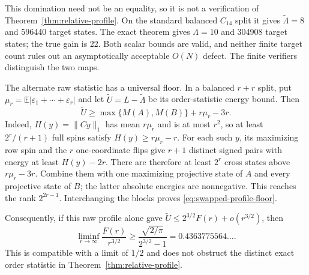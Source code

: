 \documentclass[11pt]{article}
\newcommand{\E}{\mathbb E}
\begin{document}
This domination need not be an equality, so it is not a verification of
Theorem~\ref{thm:relative-profile}.  On the standard balanced $C_{14}$ split
it gives $\widetilde\Lambda=8$ and 596440 target states.  The exact theorem
gives $\Lambda=10$ and 304908 target states; the true gain is 22.  Both scalar
bounds are valid, and neither finite target count rules out an asymptotically
acceptable $O(N)$ defect.  The finite verifiers distinguish the two maps.

The alternate raw statistic has a universal floor.  In a balanced $r+r$
split, put
$\mu_r=\E|\varepsilon_1+\cdots+\varepsilon_r|$ and let
$\widetilde U=L-\widetilde\Lambda$ be its order-statistic energy bound.  Then
\begin{equation}
 \widetilde U\ge
 \max\{M(A),M(B)\}+r\mu_r-3r.
 \label{eq:swapped-profile-floor}
\end{equation}
Indeed, $H(y)=\|Cy\|_1$ has mean $r\mu_r$ and is at most $r^2$, so at least
$2^r/(r+1)$ full spins satisfy $H(y)\ge r\mu_r-r$.  For each such $y$, its
maximizing row spin and the $r$ one-coordinate flips give $r+1$ distinct
signed pairs with energy at least $H(y)-2r$.  There are therefore at least
$2^r$ cross states above $r\mu_r-3r$.  Combine them with one maximizing
projective state of $A$ and every projective state of $B$; the latter absolute
energies are nonnegative.  This reaches the rank $2^{2r-1}$.  Interchanging
the blocks proves \eqref{eq:swapped-profile-floor}.

Consequently, if this raw profile alone gave
$\widetilde U\le2^{3/2}F(r)+o(r^{3/2})$, then
\begin{equation}
 \liminf_{r\to\infty}\frac{F(r)}{r^{3/2}}
 \ge\frac{\sqrt{2/\pi}}{2^{3/2}-1}
 =0.4363775564\ldots.
 \label{eq:swapped-profile-constant-floor}
\end{equation}
This is compatible with a limit of $1/2$ and does not obstruct the distinct
exact order statistic in Theorem~\ref{thm:relative-profile}.
\end{document}
